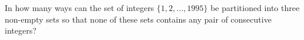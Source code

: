 In how many ways can the set of integers $\{1,2,\ldots ,1995\}$ be partitioned into three non-empty sets so that none of these sets contains any pair of consecutive integers?